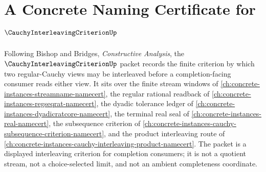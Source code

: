 \chapter{A Concrete Naming Certificate for $\CauchyInterleavingCriterionUp$}
\label{ch:concrete-instances-cauchy-interleaving-criterion-namecert}

Following Bishop and Bridges, \emph{Constructive Analysis}, the $\CauchyInterleavingCriterionUp$ packet records the finite criterion by which two regular-Cauchy views may be interleaved before a completion-facing consumer reads either view. It sits over the finite stream windows of \autoref{ch:concrete-instances-streamname-namecert}, the regular rational readback of \autoref{ch:concrete-instances-regseqrat-namecert}, the dyadic tolerance ledger of \autoref{ch:concrete-instances-dyadicratcore-namecert}, the terminal real seal of \autoref{ch:concrete-instances-real-namecert}, the subsequence criterion of \autoref{ch:concrete-instances-cauchy-subsequence-criterion-namecert}, and the product interleaving route of \autoref{ch:concrete-instances-cauchy-interleaving-product-namecert}. The packet is a displayed interleaving criterion for completion consumers; it is not a quotient stream, not a choice-selected limit, and not an ambient completeness coordinate.


